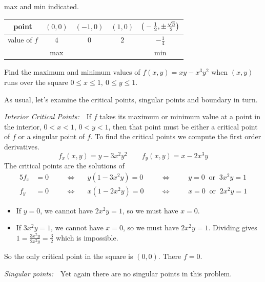 \begin{eg}
max and min indicated.
\begin{center}
\renewcommand{\arraystretch}{1.3}
     \begin{tabular}{|c|c|c|c|c|}
     \hline
       point
       &$(0,0)$
       &$(-1,0)$
       &$(1,0)$
       &$\big(-\tfrac{1}{2},\pm\tfrac{\sqrt{3}}{2}\big)$ \\ \hline
       value of $f$
       &$4$
       &$0$
       &$2$
       &$-\tfrac{1}{4}$ \\ \hline
       &max
       & 
       & 
       &min \\ \hline
     \end{tabular}
\renewcommand{\arraystretch}{1.0}
\end{center}
\end{eg}
\goodbreak

\begin{eg}\label{eg:MXMNabsC}
Find the maximum and minimum values of $f(x,y)=xy-x^3y^2$ when $(x,y)$
runs over the square $0\le x\le 1,\ 0\le y\le 1$.
\goodbreak

\soln 
As usual, let's examine the critical points, singular points and boundary
in turn.

\noindent\emph{Interior Critical Points:}\ \ 
If $f$ takes its maximum or minimum value at a point in the interior, 
$0<x<1$, $0<y<1$, then that point must be either a critical point of $f$
or a singular point of $f$.
To find the critical points we compute the first order derivatives.
\begin{equation*}
f_x(x,y)=y-3x^2y^2\qquad
f_y(x,y)=x-2x^3y
\end{equation*}
The critical points are the solutions of
\begin{alignat*}{5}
f_x&=0 & &\quad\iff\quad  &y(1-3x^2y)=0 & 
         &\quad\iff\quad & &y=0 \ \text{ or }\  3x^2y=1 \\
f_y&=0 & &\quad\iff\quad  &x(1-2x^2y)=0 & 
          &\quad\iff\quad & &x=0 \ \text{ or }\  2x^2y=1 
\end{alignat*}
\begin{itemize}
\item 
If $y=0$, we cannot have $2x^2y=1$, so we must have $x=0$.
\item
If $3x^2y=1$, we cannot have $x=0$, so we must have $2x^2y=1$. Dividing
gives $1=\tfrac{3x^2y}{2x^2y}=\tfrac{3}{2}$ which is impossible.
\end{itemize}
So the only critical point in the square is $(0,0)$. There $f=0$.

\smallskip
\noindent\emph{Singular points:}\ \  Yet again there are no singular 
points in this problem.



\end{eg}
